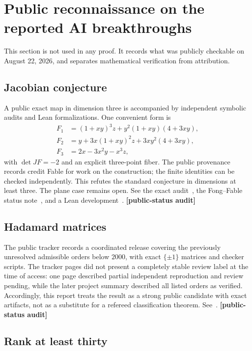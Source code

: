 \documentclass[11pt,oneside]{article}
\theoremstyle{definition}
\theoremstyle{remark}
\newcommand{\statusaudit}{\textcolor{amber}{\textbf{[public-status audit]}}}
\begin{document}
\section{Public reconnaissance on the reported AI breakthroughs}
\label{sec:recon}

This section is not used in any proof.  It records what was publicly checkable on August 22,
2026, and separates mathematical verification from attribution.

\subsection{Jacobian conjecture}

A public exact map in dimension three is accompanied by independent symbolic audits and Lean
formalizations.  One convenient form is
\[
\begin{aligned}
 F_1&=(1+xy)^3z+y^2(1+xy)(4+3xy),\\
 F_2&=y+3x(1+xy)^2z+3xy^2(4+3xy),\\
 F_3&=2x-3x^2y-x^3z,
\end{aligned}
\]
with $\det JF=-2$ and an explicit three-point fiber.  The public provenance records credit
Fable for work on the construction; the finite identities can be checked independently.
This refutes the standard conjecture in dimensions at least three.  The plane case remains
open.  See the exact audit~\cite{JacobianAudit}, the Fong--Fable status note~\cite{FongFable},
and a Lean development~\cite{JacobianLean}.  \statusaudit

\subsection{Hadamard matrices}

The public tracker records a coordinated release covering the previously unresolved admissible
orders below $2000$, with exact $\{\pm1\}$ matrices and checker scripts.  The tracker pages did
not present a completely stable review label at the time of access: one page described partial
independent reproduction and review pending, while the later project summary described all
listed orders as verified.  Accordingly, this report treats the result as a strong public
candidate with exact artifacts, not as a substitute for a refereed classification theorem.
See~\cite{HadamardTracker}.  \statusaudit

\subsection{Rank at least thirty}
\end{document}
